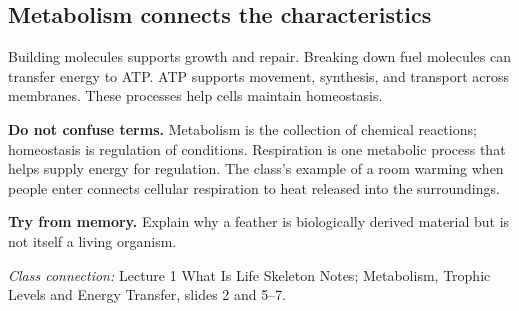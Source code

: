 \documentclass[11pt,letterpaper]{article}
\newcommand{\memorycheck}[1]{\par\smallskip\textbf{Try from memory.} #1\par}
\newcommand{\classsource}[1]{{\footnotesize\textit{Class connection:} #1\par}}
\begin{document}
\subsection*{Metabolism connects the characteristics}
Building molecules supports growth and repair. Breaking down fuel molecules can transfer energy to ATP. ATP supports movement, synthesis, and transport across membranes. These processes help cells maintain homeostasis.

\textbf{Do not confuse terms.} Metabolism is the collection of chemical reactions; homeostasis is regulation of conditions. Respiration is one metabolic process that helps supply energy for regulation. The class's example of a room warming when people enter connects cellular respiration to heat released into the surroundings.
\memorycheck{Explain why a feather is biologically derived material but is not itself a living organism.}
\classsource{Lecture 1 What Is Life Skeleton Notes; Metabolism, Trophic Levels and Energy Transfer, slides 2 and 5--7.}
\end{document}
